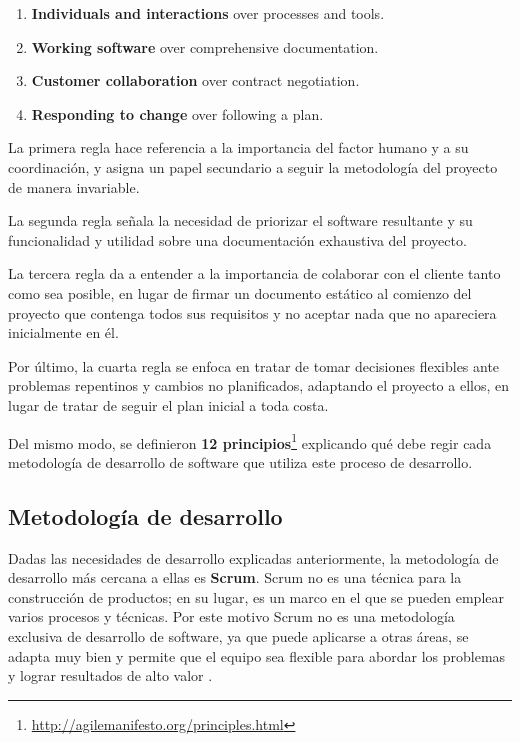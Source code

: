 \begin{center}
\begin{tcolorbox}[sharp corners,  colframe=white]
\begin{enumerate}
    \item \textbf{Individuals and interactions} over processes and tools.
    \item \textbf{Working software} over comprehensive documentation.
    \item \textbf{Customer collaboration} over contract negotiation.
    \item \textbf{Responding to change} over following a plan.
\end{enumerate}
\end{tcolorbox}
\end{center}

La primera regla hace referencia a la importancia del factor humano y a su coordinación, y asigna un papel secundario a seguir la metodología del proyecto de manera invariable.

La segunda regla señala la necesidad de priorizar el software resultante y su funcionalidad y utilidad sobre una documentación exhaustiva del proyecto.

La tercera regla da a entender a la importancia de colaborar con el cliente tanto como sea posible, en lugar de firmar un documento estático al comienzo del proyecto que contenga todos sus requisitos y no aceptar nada que no apareciera inicialmente en él.

Por último, la cuarta regla se enfoca en tratar de tomar decisiones flexibles ante problemas repentinos y cambios no planificados, adaptando el proyecto a ellos, en lugar de tratar de seguir el plan inicial a toda costa.

Del mismo modo, se definieron \textbf{12 principios}\footnote{\url{http://agilemanifesto.org/principles.html}} explicando qué debe regir cada metodología de desarrollo de software que utiliza este proceso de desarrollo.

\subsection{Metodología de desarrollo}

Dadas las necesidades de desarrollo explicadas anteriormente, la metodología de desarrollo más cercana a ellas es \textbf{Scrum}. Scrum no es una técnica para la construcción de productos; en su lugar, es un marco en el que se pueden emplear varios procesos y técnicas. Por este motivo Scrum no es una metodología exclusiva de desarrollo de software, ya que puede aplicarse a otras áreas, se adapta muy bien y permite que el equipo sea flexible para abordar los problemas y lograr resultados de alto valor \cite{scrum-guide}.

